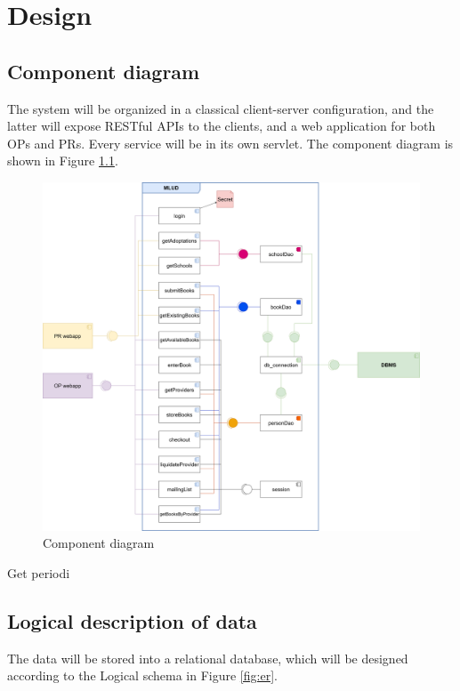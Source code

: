 \chapter{Design}

\section{Component diagram}

The system will be organized in a classical client-server configuration, and the latter will expose RESTful APIs to the clients, and a web application for both OPs and PRs. Every service will be in its own servlet. The component diagram is shown in Figure \ref{fig:component}.

\begin{figure}[H]
    \centering
    \includegraphics[width=.9\textwidth]{assets/component_diagram.png}
    \caption{Component diagram}
    \label{fig:component}
\end{figure}

{\color{red} Get periodi}

\section{Logical description of data}

The data will be stored into a relational database, which will be designed according to the Logical schema in Figure \ref{fig:er}.

